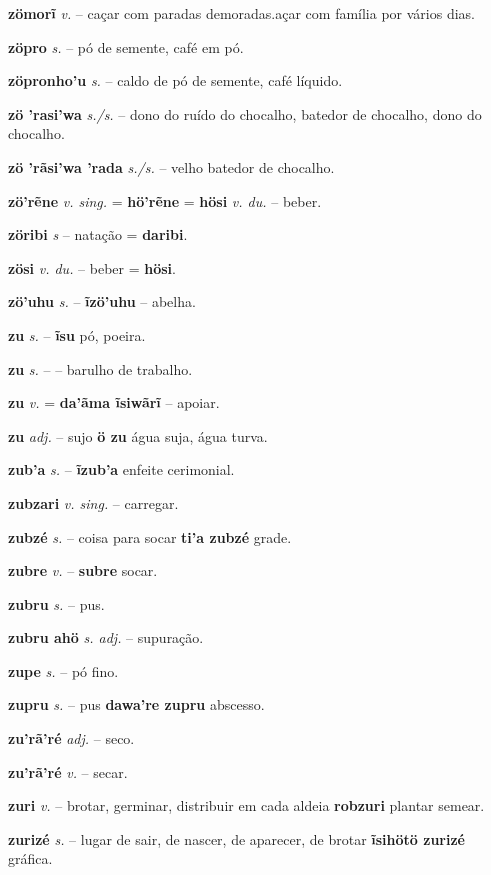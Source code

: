 \textbf{zömorĩ} \textit{v.} -- caçar com paradas demoradas.açar com família por vários dias.

\textbf{zöpro} \textit{s.} -- pó de semente, café em pó.

\textbf{zöpronho'u} \textit{s.} -- caldo de pó de semente, café líquido.

\textbf{zö 'rasi'wa} \textit{s./s.} -- dono do ruído do chocalho, batedor de chocalho, dono do chocalho.

\textbf{zö 'rãsi'wa 'rada} \textit{s./s.} -- velho batedor de chocalho.

\textbf{zö'rẽne} \textit{v. sing.} = \textbf{hö'rẽne} = \textbf{hösi} \textit{v. du.} -- beber.

\textbf{zöribi} \textit{s} -- natação = \textbf{daribi}.

\textbf{zösi} \textit{v. du.} -- beber = \textbf{hösi}.

\textbf{zö'uhu} \textit{ s.} -- \textbf{ĩzö'uhu} -- abelha.

\textbf{zu} \textit{ s.} -- \textbf{ĩsu} pó, poeira.

\textbf{zu} \textit{ s.} -- -- barulho de trabalho.

\textbf{zu} \textit{v.} = \textbf{da'ãma ĩsiwãrĩ} -- apoiar.

\textbf{zu} \textit{adj.} -- sujo  \textbf{ö zu} água suja, água turva.

\textbf{zub'a} \textit{s.} -- \textbf{ĩzub'a} enfeite cerimonial.

\textbf{zubzari} \textit{v. sing.} -- carregar.

\textbf{zubzé} \textit{s.} -- coisa para socar  \textbf{ti'a zubzé} grade.

\textbf{zubre} \textit{v.} -- \textbf{subre} socar.

\textbf{zubru} \textit{s.} -- pus.

\textbf{zubru ahö} \textit{s. adj.} -- supuração.

\textbf{zupe} \textit{s.} -- pó fino.

\textbf{zupru} \textit{s.} -- pus  \textbf{dawa're zupru} abscesso.

\textbf{zu'rã'ré} \textit{adj.} -- seco.

\textbf{zu'rã'ré} \textit{v.} -- secar.

\textbf{zuri} \textit{v.} -- brotar, germinar, distribuir em cada aldeia  \textbf{robzuri} plantar  semear.

\textbf{zurizé} \textit{s.} -- lugar de sair, de nascer, de aparecer, de brotar  \textbf{ĩsihötö zurizé} gráfica.

